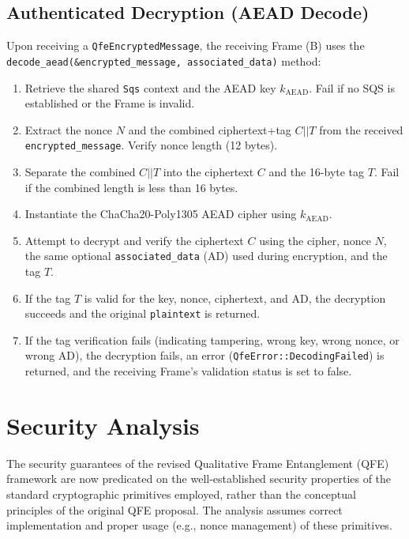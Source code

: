 \documentclass[11pt]{article}
\begin{document}
	\subsection{Authenticated Decryption (AEAD Decode)}
	Upon receiving a \texttt{QfeEncryptedMessage}, the receiving Frame (B) uses the \texttt{decode\_aead(\&encrypted\_message, associated\_data)} method:
	\begin{enumerate}
		\item Retrieve the shared \texttt{Sqs} context and the AEAD key $k_{\text{AEAD}}$. Fail if no SQS is established or the Frame is invalid.
		\item Extract the nonce $N$ and the combined ciphertext+tag $C||T$ from the received \texttt{encrypted\_message}. Verify nonce length (12 bytes).
		\item Separate the combined $C||T$ into the ciphertext $C$ and the 16-byte tag $T$. Fail if the combined length is less than 16 bytes.
		\item Instantiate the ChaCha20-Poly1305 AEAD cipher using $k_{\text{AEAD}}$.
		\item Attempt to decrypt and verify the ciphertext $C$ using the cipher, nonce $N$, the same optional \texttt{associated\_data} (AD) used during encryption, and the tag $T$.
		\item If the tag $T$ is valid for the key, nonce, ciphertext, and AD, the decryption succeeds and the original \texttt{plaintext} is returned.
		\item If the tag verification fails (indicating tampering, wrong key, wrong nonce, or wrong AD), the decryption fails, an error (\texttt{QfeError::DecodingFailed}) is returned, and the receiving Frame's validation status is set to false.
	\end{enumerate}
	
	\section{Security Analysis}
	
	The security guarantees of the revised Qualitative Frame Entanglement (QFE) framework are now predicated on the well-established security properties of the standard cryptographic primitives employed, rather than the conceptual principles of the original QFE proposal. The analysis assumes correct implementation and proper usage (e.g., nonce management) of these primitives.
	
\end{document}

